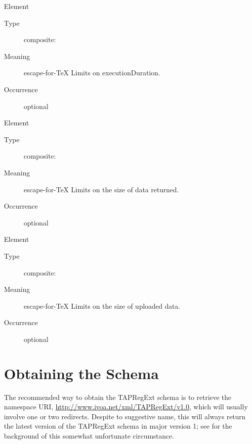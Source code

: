 \documentclass{ivoa}
\begin{document}
\begin{bigdescription}
\begin{description}
\end{description}
\item[Element \xmlel{executionDuration}]
\begin{description}
\item[Type] composite: 
\item[Meaning] escape-for-TeX{{{
              Limits on executionDuration.
              }}}
\item[Occurrence] optional

\end{description}
\item[Element \xmlel{outputLimit}]
\begin{description}
\item[Type] composite: 
\item[Meaning] escape-for-TeX{{{
              Limits on the size of data returned.
              }}}
\item[Occurrence] optional

\end{description}
\item[Element \xmlel{uploadLimit}]
\begin{description}
\item[Type] composite: 
\item[Meaning] escape-for-TeX{{{
              Limits on the size of uploaded data.
              }}}
\item[Occurrence] optional

\end{description}


\end{bigdescription}\endgroup

\endgroup

\appendix


\section{Obtaining the Schema}

\label{app:fullschema}

The recommended way to obtain the TAPRegExt schema is to retrieve the
namespace URI, \url{http://www.ivoa.net/xml/TAPRegExt/v1.0}, which will
usually involve one or two redirects.  Despite to suggestive name, this
will always return the latest version of the TAPRegExt schema in major
version 1; see \citet{2018ivoa.spec.0529H} for the background of this
somewhat unfortunate circumstance.
\end{document}
